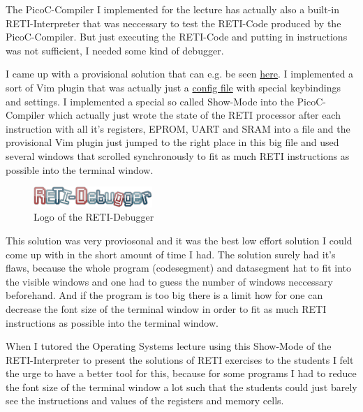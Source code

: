\documentclass{report}
\begin{document}
The PicoC-Compiler I implemented for the lecture has actually also a built-in \alert{RETI-Interpreter} that was neccessary to test the RETI-Code produced by the PicoC-Compiler. But just executing the RETI-Code and putting in  instructions was not sufficient, I needed some kind of debugger.

I came up with a provisional solution that can e.g. be seen \href{https://asciinema.org/a/526542}{here}. I implemented a sort of Vim plugin that was actually just a \href{https://github.com/matthejue/PicoC-Compiler/blob/master/src/interpr_showcase.vim}{config file} with special keybindings and settings. I implemented a special so called \alert{Show-Mode} into the PicoC-Compiler which actually just wrote the state of the RETI processor after each instruction with all it's registers, EPROM, UART and SRAM into a file and the provisional Vim plugin just jumped to the right place in this big file and used several windows that scrolled synchronously to fit as much RETI instructions as possible into the terminal window.

\begin{figure}
	\centering
	\includegraphics[width=0.4\textwidth]{./figures/reti-debugger.png}
	\caption{Logo of the RETI-Debugger}
	\label{fig:logo of the reti debugger}
\end{figure}

This solution was very proviosonal and it was the best low effort solution I could come up with in the short amount of time I had. The solution surely had it's flaws, because the whole program (codesegment) and datasegment hat to fit into the visible windows and one had to guess the number of windows neccessary beforehand. And if the program is too big there is a limit how for one can decrease the font size of the terminal window in order to fit as much RETI instructions as possible into the terminal window.

When I tutored the Operating Systems lecture using this \alert{Show-Mode} of the RETI-Interpreter to present the solutions of RETI exercises to the students I felt the urge to have a better tool for this, because for some programs I had to reduce the font size of the terminal window a lot such that the students could just barely see the instructions and values of the registers and memory cells.
\end{document}
